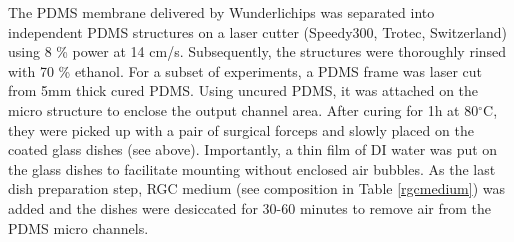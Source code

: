 The PDMS membrane delivered by Wunderlichips was separated into independent PDMS
structures on a laser cutter (Speedy300, Trotec, Switzerland) using 8 \% power
at 14 cm/s. Subsequently, the structures were thoroughly rinsed with 70 \%
ethanol. For a subset of experiments, a PDMS frame was laser cut from 5mm thick
cured PDMS. Using uncured PDMS, it was attached on the micro structure to
enclose the output channel area. After curing for 1h at 80$^{\circ}$C, they were
picked up with a pair of surgical forceps and slowly placed on the coated glass
dishes (see above). Importantly, a thin film of DI water was put on the glass
dishes to facilitate mounting without enclosed air bubbles. As the last dish
preparation step, RGC medium (see composition in Table \ref{rgcmedium}) was
added and the dishes were desiccated for 30-60 minutes to remove air from the
PDMS micro channels.

